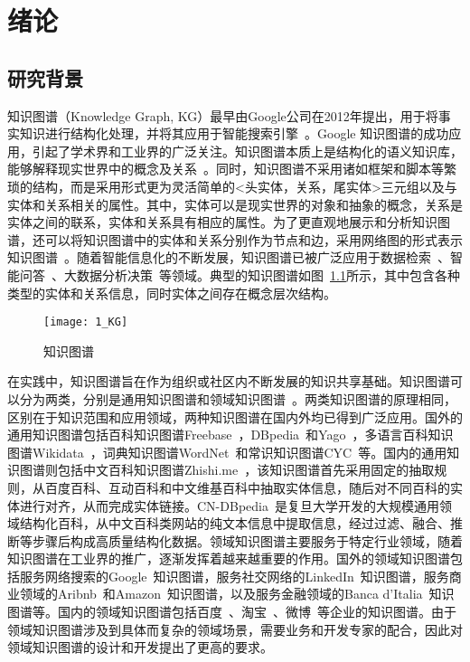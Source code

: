 \documentclass[algorithmlist, AutoFakeBold, AutoFakeSlant, figurelist, tablelist, nomlist, masters]{seuthesix}
\begin{document}
\chapter{绪论}
\section{研究背景}
知识图谱（Knowledge Graph, KG）最早由Google公司在2012年提出，用于将事实知识进行结构化处理，并将其应用于智能搜索引擎~\cite{singhal_2012}。Google 知识图谱的成功应用，引起了学术界和工业界的广泛关注。知识图谱本质上是结构化的语义知识库，能够解释现实世界中的概念及关系~\cite{nickel2015review}。同时，知识图谱不采用诸如框架和脚本等繁琐的结构，而是采用形式更为灵活简单的<头实体，关系，尾实体>三元组以及与实体和关系相关的属性。其中，实体可以是现实世界的对象和抽象的概念，关系是实体之间的联系，实体和关系具有相应的属性。为了更直观地展示和分析知识图谱，还可以将知识图谱中的实体和关系分别作为节点和边，采用网络图的形式表示知识图谱~\cite{noy2019industry}。随着智能信息化的不断发展，知识图谱已被广泛应用于数据检索~\cite{rinaldi2021semantic,sarhan2021open,li2021research}、智能问答~\cite{li2021improving,do2021developing}、大数据分析决策~\cite{zhou2021geoscience,abu2021relational}等领域。典型的知识图谱如图~\ref{1_KG}所示，其中包含各种类型的实体和关系信息，同时实体之间存在概念层次结构。

\begin{figure}
  \centering
  \texttt{[image: 1\_KG]}
  \caption{知识图谱}
  \label{1_KG}
\end{figure}

在实践中，知识图谱旨在作为组织或社区内不断发展的知识共享基础。知识图谱可以分为两类，分别是通用知识图谱和领域知识图谱~\cite{hogan2021knowledge}。两类知识图谱的原理相同，区别在于知识范围和应用领域，两种知识图谱在国内外均已得到广泛应用。国外的通用知识图谱包括百科知识图谱Freebase~\cite{bollacker2007platform}，DBpedia~\cite{lehmann2015dbpedia}和Yago~\cite{hoffart2011yago2}，多语言百科知识图谱Wikidata~\cite{vrandevcic2014wikidata}，词典知识图谱WordNet~\cite{miller2007wordnet}和常识知识图谱CYC~\cite{lenat1995cyc}等。国内的通用知识图谱则包括中文百科知识图谱Zhishi.me~\cite{niu2011zhishi}，该知识图谱首先采用固定的抽取规则，从百度百科、互动百科和中文维基百科中抽取实体信息，随后对不同百科的实体进行对齐，从而完成实体链接。CN-DBpedia~\cite{xu2017cn}是复旦大学开发的大规模通用领域结构化百科，从中文百科类网站的纯文本信息中提取信息，经过过滤、融合、推断等步骤后构成高质量结构化数据。领域知识图谱主要服务于特定行业领域，随着知识图谱在工业界的推广，逐渐发挥着越来越重要的作用。国外的领域知识图谱包括服务网络搜索的Google~\cite{singhal_2012}知识图谱，服务社交网络的LinkedIn~\cite{Qi_2016}知识图谱，服务商业领域的Aribnb~\cite{Spencer_2018}和Amazon~\cite{Krishnan_2018}知识图谱，以及服务金融领域的Banca d’Italia~\cite{bellomarini2019knowledge}知识图谱等。国内的领域知识图谱包括百度~\cite{wang2013xlore}、淘宝~\cite{xu2021alime}、微博~\cite{wei2020analysis}等企业的知识图谱。由于领域知识图谱涉及到具体而复杂的领域场景，需要业务和开发专家的配合，因此对领域知识图谱的设计和开发提出了更高的要求。
\end{document}
